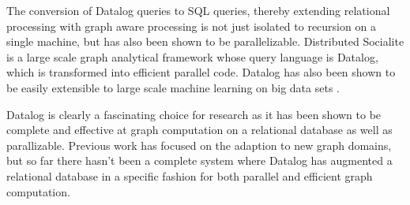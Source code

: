 \documentclass[11pt,letterpaper]{article}
\begin{document}
The conversion of Datalog queries to SQL queries, thereby extending relational processing with graph aware processing is not just isolated to recursion on a single machine, but has also been shown to be parallelizable. Distributed Socialite \cite{seo_distributed_2013} is a large scale graph analytical framework whose query language is Datalog, which is transformed into efficient parallel code. Datalog has also been shown to be easily extensible to large scale machine learning on big data sets \cite{bu_scaling_2012}.

Datalog is clearly a fascinating choice for research as it has been shown to be complete and effective at graph computation on a relational database as well as parallizable. Previous work has focused on the adaption to new graph domains, but so far there hasn't been a complete system where Datalog has augmented a relational database in a specific fashion for both parallel and efficient graph computation.
\end{document}

